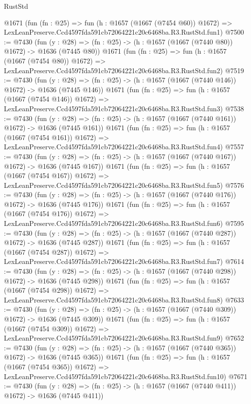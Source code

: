 \begin{lexlean}{RustStd}
\begin{coremodule}
    @1671
    (fun (fn : @25) =>
    fun (h : @1657 (@1667 (@7454 @60)) @1672) =>
    LexLeanPreserve.Ccd4597fda591cb72064221c20c6468ba.R3.RustStd.fun1)
@7500 := @7430
    (fun (y : @28) => (fn : @25) -> (h : @1657 (@1667 (@7440 @80)) @1672) -> @1636 (@7445 @80))
    @1671
    (fun (fn : @25) =>
    fun (h : @1657 (@1667 (@7454 @80)) @1672) =>
    LexLeanPreserve.Ccd4597fda591cb72064221c20c6468ba.R3.RustStd.fun2)
@7519 := @7430
    (fun (y : @28) => (fn : @25) -> (h : @1657 (@1667 (@7440 @146)) @1672) -> @1636 (@7445 @146))
    @1671
    (fun (fn : @25) =>
    fun (h : @1657 (@1667 (@7454 @146)) @1672) =>
    LexLeanPreserve.Ccd4597fda591cb72064221c20c6468ba.R3.RustStd.fun3)
@7538 := @7430
    (fun (y : @28) => (fn : @25) -> (h : @1657 (@1667 (@7440 @161)) @1672) -> @1636 (@7445 @161))
    @1671
    (fun (fn : @25) =>
    fun (h : @1657 (@1667 (@7454 @161)) @1672) =>
    LexLeanPreserve.Ccd4597fda591cb72064221c20c6468ba.R3.RustStd.fun4)
@7557 := @7430
    (fun (y : @28) => (fn : @25) -> (h : @1657 (@1667 (@7440 @167)) @1672) -> @1636 (@7445 @167))
    @1671
    (fun (fn : @25) =>
    fun (h : @1657 (@1667 (@7454 @167)) @1672) =>
    LexLeanPreserve.Ccd4597fda591cb72064221c20c6468ba.R3.RustStd.fun5)
@7576 := @7430
    (fun (y : @28) => (fn : @25) -> (h : @1657 (@1667 (@7440 @176)) @1672) -> @1636 (@7445 @176))
    @1671
    (fun (fn : @25) =>
    fun (h : @1657 (@1667 (@7454 @176)) @1672) =>
    LexLeanPreserve.Ccd4597fda591cb72064221c20c6468ba.R3.RustStd.fun6)
@7595 := @7430
    (fun (y : @28) => (fn : @25) -> (h : @1657 (@1667 (@7440 @287)) @1672) -> @1636 (@7445 @287))
    @1671
    (fun (fn : @25) =>
    fun (h : @1657 (@1667 (@7454 @287)) @1672) =>
    LexLeanPreserve.Ccd4597fda591cb72064221c20c6468ba.R3.RustStd.fun7)
@7614 := @7430
    (fun (y : @28) => (fn : @25) -> (h : @1657 (@1667 (@7440 @298)) @1672) -> @1636 (@7445 @298))
    @1671
    (fun (fn : @25) =>
    fun (h : @1657 (@1667 (@7454 @298)) @1672) =>
    LexLeanPreserve.Ccd4597fda591cb72064221c20c6468ba.R3.RustStd.fun8)
@7633 := @7430
    (fun (y : @28) => (fn : @25) -> (h : @1657 (@1667 (@7440 @309)) @1672) -> @1636 (@7445 @309))
    @1671
    (fun (fn : @25) =>
    fun (h : @1657 (@1667 (@7454 @309)) @1672) =>
    LexLeanPreserve.Ccd4597fda591cb72064221c20c6468ba.R3.RustStd.fun9)
@7652 := @7430
    (fun (y : @28) => (fn : @25) -> (h : @1657 (@1667 (@7440 @365)) @1672) -> @1636 (@7445 @365))
    @1671
    (fun (fn : @25) =>
    fun (h : @1657 (@1667 (@7454 @365)) @1672) =>
    LexLeanPreserve.Ccd4597fda591cb72064221c20c6468ba.R3.RustStd.fun10)
@7671 := @7430
    (fun (y : @28) => (fn : @25) -> (h : @1657 (@1667 (@7440 @411)) @1672) -> @1636 (@7445 @411))

\end{coremodule}
\end{lexlean}
